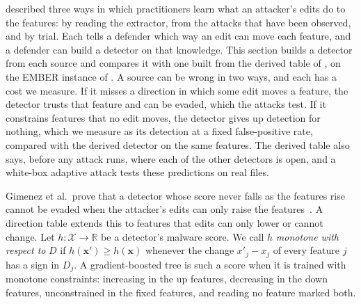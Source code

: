 
 described three ways in which practitioners learn what an attacker's edits do to the features:
by reading the extractor, from the attacks that have been observed, and by trial. Each tells a defender which way an edit
can move each feature, and a defender can build a detector on that knowledge. This section builds a detector from each
source and compares it with one built from the derived table of
, on the EMBER instance of . A source can be wrong in two ways, and each
has a cost we measure. If it misses a direction in which some edit moves a feature, the detector trusts that feature
and can be evaded, which the attacks test. If it constrains features that no edit moves, the detector gives up
detection for nothing, which we measure as its detection at a fixed false-positive rate, compared with the derived
detector on the same features. The derived table also says, before any attack runs, where each of the other detectors is open, and a
white-box adaptive attack tests these predictions on real files.

Gimenez et al.\ prove that a detector whose score never falls as the features rise cannot be evaded when the attacker's
edits can only raise the features~\cite{gimenez2025certifiably}. A direction table extends this to features that edits can
only lower or cannot change. Let
$h: \mathcal{X} \to \mathbb{R}$ be a detector's malware score. We call $h$ \emph{monotone with respect to} $D$ if
$h(\mathbf{x}') \ge h(\mathbf{x})$ whenever the change $x'_j - x_j$ of every feature $j$ has a sign in $D_j$. A
gradient-boosted tree is such a score when it is trained with monotone constraints: increasing in the up features,
decreasing in the down features, unconstrained in the fixed features, and reading no feature marked both.


